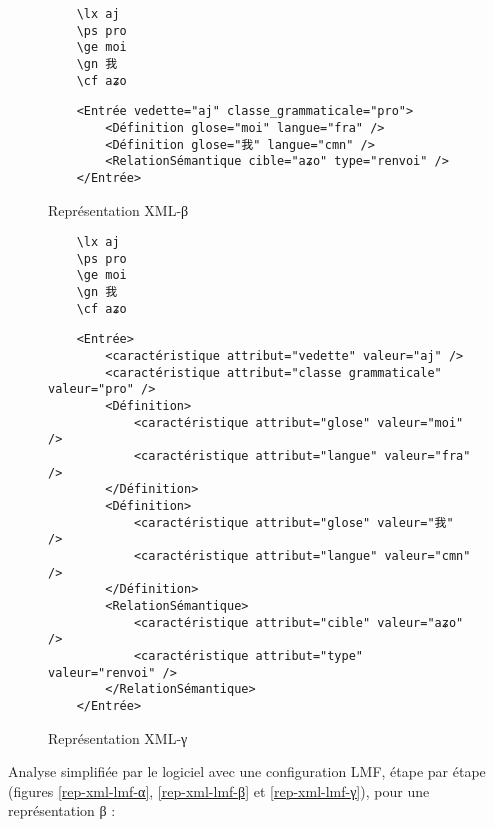 \documentclass[10pt]{report}
\begin{document}
\begin{figure}[H]
	\centering
	\begin{minipage}{0.2\linewidth}
    \begin{verbatim}
    \lx aj
    \ps pro
    \ge moi
    \gn 我
    \cf aʑo
    \end{verbatim}
	\end{minipage}%
	\begin{minipage}{0.8\linewidth}
    \begin{verbatim}
    <Entrée vedette="aj" classe_grammaticale="pro">
        <Définition glose="moi" langue="fra" />
        <Définition glose="我" langue="cmn" />
        <RelationSémantique cible="aʑo" type="renvoi" />
    </Entrée>
    \end{verbatim}	
	\end{minipage}
	\caption{Représentation XML-β}
	\label{rep-xml-β}
\end{figure}

\begin{figure}[H]
	\centering
	\begin{minipage}{0.2\linewidth}
    \begin{verbatim}
    \lx aj
    \ps pro
    \ge moi
    \gn 我
    \cf aʑo
    \end{verbatim}
	\end{minipage}%
	\begin{minipage}{0.8\linewidth}
    \begin{verbatim}
    <Entrée>
        <caractéristique attribut="vedette" valeur="aj" />
        <caractéristique attribut="classe grammaticale" valeur="pro" />
        <Définition>
            <caractéristique attribut="glose" valeur="moi" />
            <caractéristique attribut="langue" valeur="fra" />
        </Définition>
        <Définition>
            <caractéristique attribut="glose" valeur="我" />
            <caractéristique attribut="langue" valeur="cmn" />
        </Définition>
        <RelationSémantique>
            <caractéristique attribut="cible" valeur="aʑo" />
            <caractéristique attribut="type" valeur="renvoi" />
        </RelationSémantique>
    </Entrée>
    \end{verbatim}	
	\end{minipage}
	\caption{Représentation XML-γ}
	\label{rep-xml-γ}
\end{figure}

Analyse simplifiée par le logiciel avec une configuration LMF, étape par étape (figures \ref{rep-xml-lmf-α}, \ref{rep-xml-lmf-β} et \ref{rep-xml-lmf-γ}), pour une représentation β :
\end{document}
